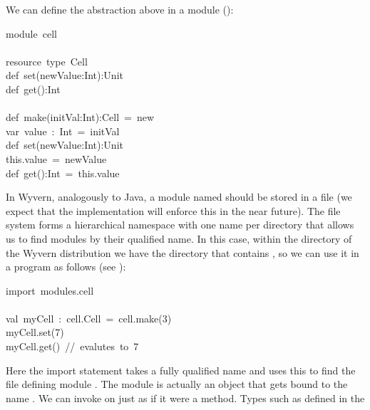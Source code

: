 \documentclass{article}
\begin{document}
\noindent{}We can define the  abstraction above in a module ():%
\begin{mdpre}%
\noindent module~cell\\
\\
resource~type~Cell\\
def~set(newValue:Int):Unit\\
def~get():Int\\
\\
def~make(initVal:Int):Cell~=~new\\
var~value~:~Int~=~initVal\\
def~set(newValue:Int):Unit\\
this.value~=~newValue\\
def~get():Int~=~this.value%
\end{mdpre}\noindent{}In Wyvern, analogously to Java, a module named  should be stored in
a file  (we expect that the implementation will enforce this in
the near future).  The file system forms a hierarchical namespace with one
name per directory that allows us to find modules by their qualified
name.  In this case, within the  directory of the Wyvern
distribution we have the directory  that contains ,
so we can use it in a program as follows (see ):
\begin{mdpre}%
\noindent import~modules.cell\\
\\
val~myCell~:~cell.Cell~=~cell.make(3)\\
myCell.set(7)\\
myCell.get()~//~evalutes~to~7\\
\end{mdpre}\noindent{}Here the import statement takes a fully qualified name and uses this to
find the file defining module .  The module is actually an object
that gets bound to the name .  We can invoke  on 
just as if it were a method.  Types such as  defined in the 
\end{document}
